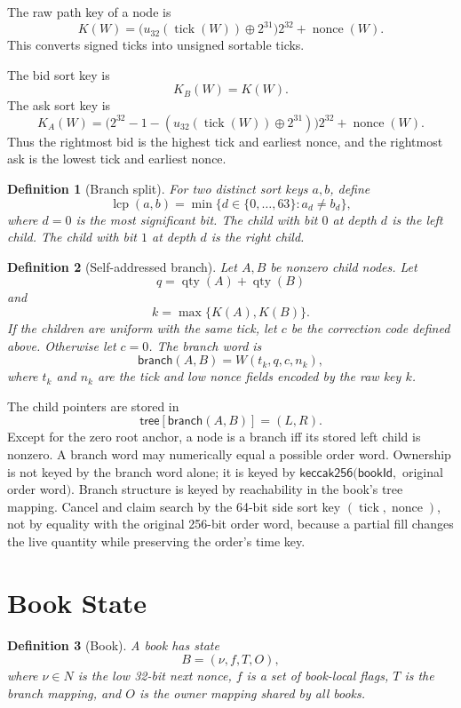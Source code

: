 \documentclass[11pt]{article}
\newtheorem{definition}{Definition}
\DeclareMathOperator{\tick}{tick}
\DeclareMathOperator{\qty}{qty}
\DeclareMathOperator{\nonce}{nonce}
\DeclareMathOperator{\lcp}{lcp}
\begin{document}
The raw path key of a node is
\[
  K(W)=\bigl(u_{32}(\tick(W))\oplus 2^{31}\bigr)2^{32}+\nonce(W).
\]
This converts signed ticks into unsigned sortable ticks.

The bid sort key is
\[
  K_B(W)=K(W).
\]
The ask sort key is
\[
  K_A(W)=\bigl(2^{32}-1-(u_{32}(\tick(W))\oplus 2^{31})\bigr)2^{32}
    +\nonce(W).
\]
Thus the rightmost bid is the highest tick and earliest nonce, and the
rightmost ask is the lowest tick and earliest nonce.

\begin{definition}[Branch split]
For two distinct sort keys \(a,b\), define
\[
  \lcp(a,b)=\min\{d\in\{0,\ldots,63\}:a_d\ne b_d\},
\]
where \(d=0\) is the most significant bit.  The child with bit \(0\) at
depth \(d\) is the left child.  The child with bit \(1\) at depth \(d\)
is the right child.
\end{definition}

\begin{definition}[Self-addressed branch]
Let \(A,B\) be nonzero child nodes.  Let
\[
  q=\qty(A)+\qty(B)
\]
and
\[
  k=\max\{K(A),K(B)\}.
\]
If the children are uniform with the same tick, let \(c\) be the
correction code defined above.  Otherwise let \(c=0\).  The branch word
is
\[
  \mathsf{branch}(A,B)=W(t_k,q,c,n_k),
\]
where \(t_k\) and \(n_k\) are the tick and low nonce fields encoded by
the raw key \(k\).
\end{definition}

The child pointers are stored in
\[
  \mathsf{tree}[\mathsf{branch}(A,B)] = (L,R).
\]
Except for the zero root anchor, a node is a branch iff its stored left
child is nonzero.  A branch word may numerically equal a possible order
word.  Ownership is not keyed by the branch word alone; it is keyed by
\(\mathsf{keccak256}(\mathsf{bookId},\) original order word\()\).
Branch structure is keyed by reachability in the book's tree mapping.
Cancel and claim search by the 64-bit side sort key \((\tick,\nonce)\),
not by equality with the original 256-bit order word, because a partial
fill changes the live quantity while preserving the order's time key.

\section{Book State}

\begin{definition}[Book]
A book has state
\[
  B=(\nu,f,T,O),
\]
where \(\nu\in N\) is the low 32-bit next nonce, \(f\) is a set of
book-local flags, \(T\) is the branch mapping, and \(O\) is the owner
mapping shared by all books.
\end{definition}
\end{document}
